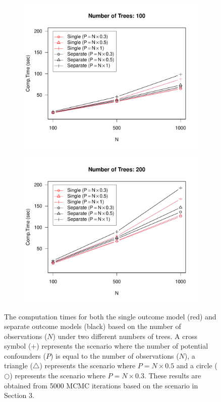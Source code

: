 \begin{figure}[htbp]
\begin{subfigure}{0.5\textwidth}
\includegraphics[width=\linewidth]{fig/speed_trees100.pdf}
\end{subfigure}%
\begin{subfigure}{0.5\textwidth}
\includegraphics[width=\linewidth]{fig/speed_trees200.pdf}
\end{subfigure}
\caption{The computation times for both the single outcome model (red) and separate outcome models (black) based on the number of observations ($N$) under two different numbers of trees. A cross symbol (+) represents the scenario where the number of potential confounders ($P$) is equal to the number of observations ($N$), a triangle ($\bigtriangleup$) represents the scenario where $P=N\times 0.5$ and a circle ($\bigcirc$) represents the scenario where $P=N\times 0.3$. These results are obtained from 5000 MCMC iterations based on the scenario in Section 3.}\label{fig:speed}
\end{figure}






